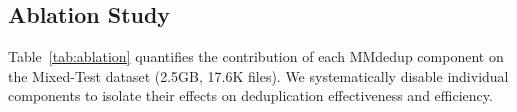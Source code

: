 \documentclass[sigconf, nonacm]{acmart}
\renewcommand{\arraystretch}{1.15}
\begin{document}

\subsection{Ablation Study}

Table~\ref{tab:ablation} quantifies the contribution of each MMdedup component on the Mixed-Test dataset (2.5GB, 17.6K files). We systematically disable individual components to isolate their effects on deduplication effectiveness and efficiency.
\end{document}
